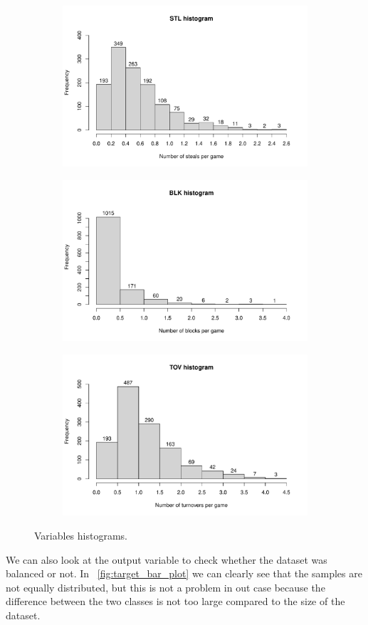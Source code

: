 \begin{figure}[H]
\begin{subfigure}{.33\textwidth}
		\label{fig:HistAST}
	\end{subfigure}%
	\begin{subfigure}{.33\textwidth}
		\centering
		\includegraphics[width=0.6\linewidth]{ImageFiles/Histograms/histogram_stl.pdf}
		\label{fig:HistSTL}
	\end{subfigure}%
	\begin{subfigure}{.33\textwidth}
		\centering
		\includegraphics[width=0.6\linewidth]{ImageFiles/Histograms/histogram_blk.pdf}
		\label{fig:HistBLK}
	\end{subfigure}
	\begin{subfigure}{.33\textwidth}
		\centering
		\includegraphics[width=0.6\linewidth]{ImageFiles/Histograms/histogram_tov.pdf}
		\label{fig:HistTOV}
	\end{subfigure}
	\caption{Variables histograms.}
	\label{fig:Histograms}
\end{figure}

We can also look at the output variable to check whether the dataset was balanced or not. In \Fig~\ref{fig:target_bar_plot} we can clearly see that the samples are not equally distributed, but this is not a problem in out case because the difference between the two classes is not too large compared to the size of the dataset.


